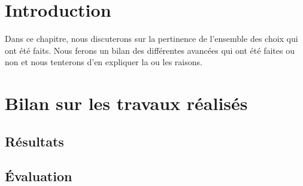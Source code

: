 \section*{Introduction}
Dans ce chapitre, nous discuterons sur la pertinence de l’ensemble des choix qui ont été faits. Nous ferons un bilan des différentes avancées qui ont été faites ou non et nous tenterons d’en expliquer la ou les raisons.
\section{Bilan sur les travaux réalisés}
\subsection*{Résultats}
\subsection*{Évaluation}
